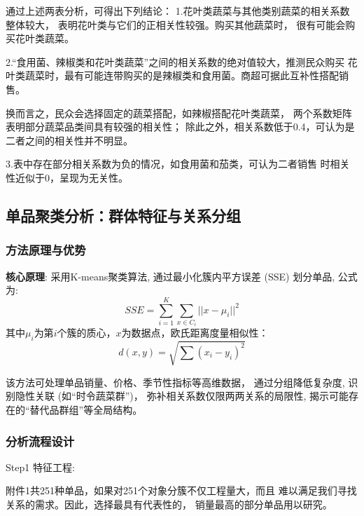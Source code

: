 \documentclass{cumcmthesis}
\begin{document}
通过上述两表分析，可得出下列结论：
1.花叶类蔬菜与其他类别蔬菜的相关系数整体较大，
表明花叶类与它们的正相关性较强。购买其他蔬菜时，
很有可能会购买花叶类蔬菜。

2.“食用菌、辣椒类和花叶类蔬菜”之间的相关系数的绝对值较大，推测民众购买
花叶类蔬菜时，最有可能连带购买的是辣椒类和食用菌。商超可据此互补性搭配销售。

换而言之，民众会选择固定的蔬菜搭配，如辣椒搭配花叶类蔬菜，
两个系数矩阵表明部分蔬菜品类间具有较强的相关性；
除此之外，相关系数低于0.4，可认为是二者之间的相关性并不明显。

3.表中存在部分相关系数为负的情况，如食用菌和茄类，可认为二者销售
时相关性近似于0，呈现为无关性。

\subsection{单品聚类分析：群体特征与关系分组}
\subsubsection{方法原理与优势}

\textbf{核心原理}: 采用K-means聚类算法, 通过最小化簇内平方误差 (SSE) 划分单品, 公式为: 
\begin{equation}
SSE=\sum_{i=1}^{K}\sum_{x\in C_i}||x-\mu_i||^2
\end{equation}  
其中$\mu_i$为第$i$个簇的质心，$x$为数据点，欧氏距离度量相似性：  
\begin{equation}
d(x,y)=\sqrt{\sum (x_i-y_i)^2}
\end{equation}

 该方法可处理单品销量、价格、季节性指标等高维数据， 
 通过分组降低复杂度, 识别隐性关联 (如“时令蔬菜群”)，
 弥补相关系数仅限两两关系的局限性, 揭示可能存在的“替代品群组”等全局结构。 

\subsubsection{分析流程设计}

    Step1 特征工程: 
    

    附件1共251种单品，如果对251个对象分簇不仅工程量大，而且
    难以满足我们寻找关系的需求。因此，选择最具有代表性的，
    销量最高的部分单品用以研究。
\end{document}
